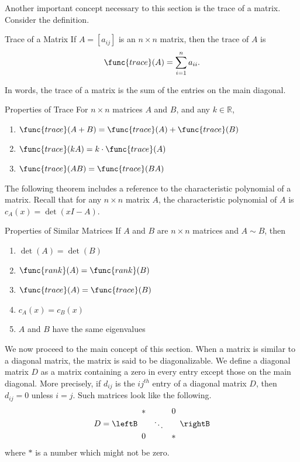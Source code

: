 Another important concept necessary to this section is the trace of a matrix. Consider the definition.

\begin{definition}{Trace of a Matrix}\label{def:matrixtrace}
If $A=[a_{ij}]$ is an $n\times n$ matrix, then the
trace of $A$ is
\[ \func{trace}(A) = \sum_{i=1}^n a_{ii}.\]
\end{definition}

In words, the trace of a matrix is the sum of the entries on the main diagonal. 

\begin{lemma}{Properties of Trace}\label{lem:traceproperties}
For $n\times n$ matrices $A$ and $B$, and any $k\in\mathbb{R}$,
\begin{enumerate}
\item $\func{trace}(A+B)=\func{trace}(A) + \func{trace}(B)$
\item $\func{trace}(kA)=k\cdot\func{trace}(A)$
\item $\func{trace}(AB)=\func{trace}(BA)$
\end{enumerate}
\end{lemma}

The following theorem includes a reference to the characteristic polynomial of a matrix. Recall that for any $n \times n$ matrix $A$, the characteristic polynomial of $A$ is $c_A(x)=\det(xI-A)$.

\begin{theorem}{Properties of Similar Matrices}\label{thm:propertiessimilar}
If $A$ and $B$ are $n\times n$ matrices and $A\sim B$, then
\begin{enumerate}
\item $\det(A) = \det(B)$
\item $\func{rank}(A) = \func{rank}(B)$
\item $\func{trace}(A)= \func{trace}(B)$
\item $c_A(x)=c_B(x)$
\item $A$ and $B$ have the same eigenvalues
\end{enumerate}
\end{theorem}

We now proceed to the main concept of this section. When a matrix is similar to a diagonal matrix, the matrix is said to
be
 diagonalizable. 
We define a diagonal matrix $D$ as a matrix containing a zero in every entry 
except those on the main diagonal.  More precisely, if $d_{ij}$ is the $ij^{th}$ entry of a diagonal matrix $D$, then
$d_{ij}=0$ unless $i=j$. Such
matrices look like the following.
\begin{equation*}
D = \leftB
\begin{array}{ccc}
\ast &  & 0 \\
& \ddots &  \\
0 &  & \ast
\end{array}
\rightB
\end{equation*}
where $\ast $ is a number which might not be zero.

